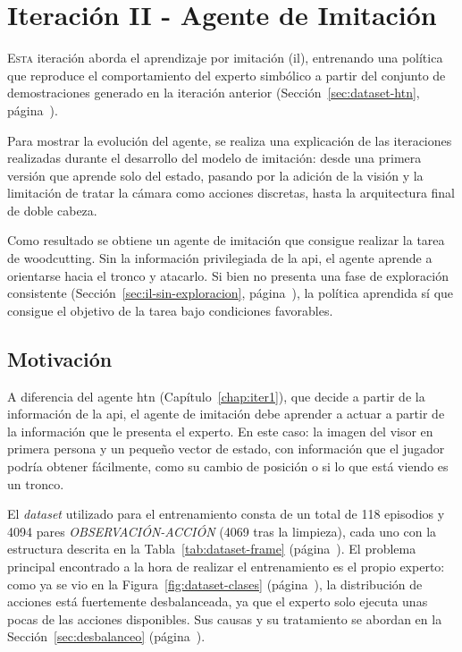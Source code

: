 \chapter{Iteración II - Agente de Imitación}
\label{chap:iter2}

\lettrine{E}{sta} iteración aborda el aprendizaje por imitación (\gls{il}), entrenando
una \gls{política} que reproduce el comportamiento del experto simbólico a partir del
conjunto de demostraciones generado en la iteración anterior (Sección~\ref{sec:dataset-htn}, página~\pageref{sec:dataset-htn}).

Para mostrar la evolución del agente, se realiza una explicación
de las iteraciones realizadas durante el desarrollo del modelo de imitación: desde una primera
versión que aprende solo del estado, pasando por la adición de la visión y la
limitación de tratar la cámara como acciones discretas, hasta la arquitectura final
de doble cabeza.

Como resultado se obtiene un agente de imitación que consigue realizar la tarea de
\gls{woodcutting}. Sin la información privilegiada de la \acrshort{api}, el agente aprende
a orientarse hacia el tronco y atacarlo. Si bien no presenta una fase de exploración
consistente (Sección~\ref{sec:il-sin-exploracion}, página~\pageref{sec:il-sin-exploracion}),
la política aprendida sí que consigue el objetivo de la tarea bajo condiciones favorables.

\section{Motivación}
A diferencia del agente \gls{htn} (Capítulo~\ref{chap:iter1}), que decide a partir de la información de la \acrshort{api}, el agente de imitación debe aprender a actuar
a partir de la información que le presenta el experto. En este caso: la imagen del
visor en primera persona y un pequeño vector de estado, con información que el jugador podría obtener
fácilmente, como su cambio de posición o si lo que está viendo es un tronco.

El \textit{dataset} utilizado para el entrenamiento consta de un total de 
\num{118} episodios y \num{4094} pares \textit{OBSERVACIÓN-ACCIÓN} (\num{4069} tras la limpieza), cada
uno con la estructura descrita en la Tabla~\ref{tab:dataset-frame}
(página~\pageref{tab:dataset-frame}). 
El problema principal encontrado a la hora de realizar el entrenamiento
es el propio experto: como ya se vio en la Figura~\ref{fig:dataset-clases}
(página~\pageref{fig:dataset-clases}), la distribución de acciones está
fuertemente desbalanceada, ya que el experto solo ejecuta unas pocas de las
acciones disponibles. Sus causas y su tratamiento se abordan en la
Sección~\ref{sec:desbalanceo} (página~\pageref{sec:desbalanceo}).

